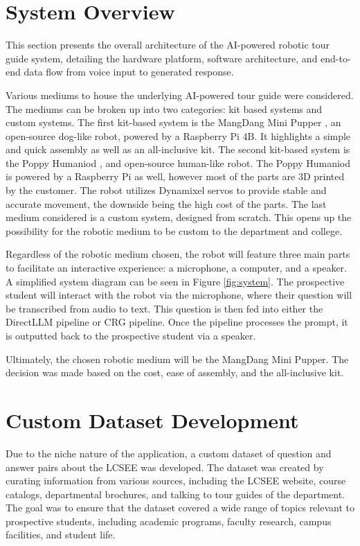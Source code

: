 \documentclass[conference]{IEEEtran}
\begin{document}
\section{System Overview}
This section presents the overall architecture of the AI-powered robotic tour guide system, detailing the hardware platform,
software architecture, and end-to-end data flow from voice input to generated response.

Various mediums to house the underlying AI-powered tour guide were considered. The mediums can be broken up into two categories: kit based systems and custom systems.
The first kit-based system is the MangDang Mini Pupper \cite{b1}, an open-source dog-like robot, powered by a Raspberry Pi 4B. It highlights a simple and quick assembly as well as an all-inclusive kit. 
The second kit-based system is the Poppy Humaniod \cite{b6}, and open-source human-like robot. The Poppy Humaniod is powered by a Raspberry Pi as well, however most of the parts are 3D printed by the customer. The robot utilizes Dynamixel servos to provide stable and accurate movement, the downside being the high cost of the parts.
The last medium considered is a custom system, designed from scratch. This opens up the possibility for the robotic medium to be custom to the department and college. 

Regardless of the robotic medium chosen, the robot will feature three main parts to facilitate an interactive experience: a microphone, a computer, and a speaker. 
A simplified system diagram can be seen in Figure \ref{fig:system}. The prospective student will interact with the robot via the microphone, where their question will be transcribed from audio to text.
This question is then fed into either the DirectLLM pipeline or CRG pipeline. Once the pipeline processes the prompt, it is outputted back to the prospective student via a speaker.

Ultimately, the chosen robotic medium will be the MangDang Mini Pupper. 
The decision was made based on the cost, ease of assembly, and the all-inclusive kit.

\section{Custom Dataset Development}
Due to the niche nature of the application, a custom dataset of question and answer pairs about the LCSEE was developed.
The dataset was created by curating information from various sources, including the LCSEE website, course catalogs, departmental brochures, and talking to tour guides of the department. 
The goal was to ensure that the dataset covered a wide range of topics relevant to prospective students, including academic programs, faculty research, campus facilities, and student life.
\end{document}
